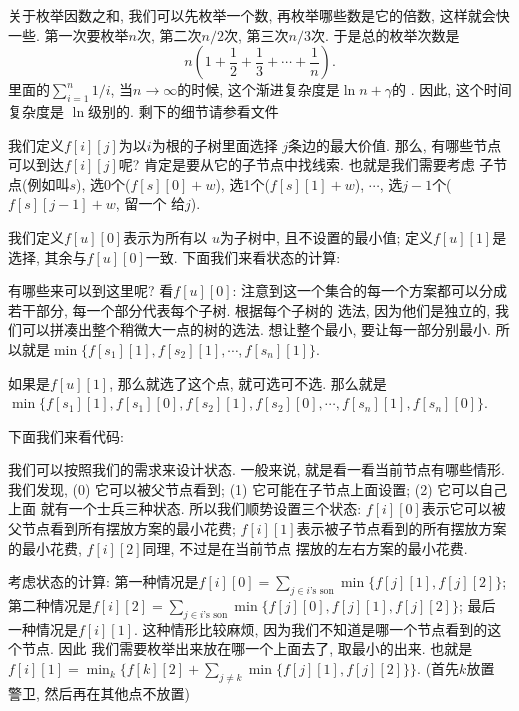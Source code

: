 关于枚举因数之和, 我们可以先枚举一个数, 再枚举哪些数是它的倍数, 这样就会快一些. 
第一次要枚举$n$次, 第二次$n/2$次, 第三次$n/3$次. 于是总的枚举次数是
$$
n\left(1+\frac12 +\frac13+\cdots + \frac1n\right).
$$
里面的$\sum_{i=1}^{n} 1/i$, 当$n\to \infty$的时候, 这个渐进复杂度是$\ln n + \gamma$的
. 
因此, 这个时间复杂度是
$\ln$级别的. 剩下的细节请参看文件

 我们定义$f[i][j]$为以$i$为根的子树里面选择
$j$条边的最大价值. 那么, 有哪些节点可以到达$f[i][j]$呢? 肯定是要从它的子节点中找线索. 也就是我们需要考虑
子节点(例如叫$s$), 选0个($f[s][0]+w$), 选1个($f[s][1]+w$), $\cdots$, 选$j-1$个($f[s][j-1]+w$, 留一个
给$j$). 

我们定义$f[u][0]$表示为所有以
$u$为子树中, 且不设置的最小值; 定义$f[u][1]$是选择, 其余与$f[u][0]$一致. 下面我们来看状态的计算: 

有哪些来可以到这里呢? 
看$f[u][0]$: 注意到这一个集合的每一个方案都可以分成若干部分, 每一个部分代表每个子树. 根据每个子树的
选法, 因为他们是独立的, 我们可以拼凑出整个稍微大一点的树的选法. 想让整个最小, 要让每一部分别最小. 
所以就是$\min\{f[s_1][1],f[s_2][1],\cdots, f[s_n][1]\}$. 

如果是$f[u][1]$, 那么就选了这个点, 就可选可不选. 
那么就是$\min\{f[s_1][1],f[s_1][0],f[s_2][1],f[s_2][0],\cdots, f[s_n][1],f[s_n][0]\}$.

下面我们来看代码: 

 我们可以按照我们的需求来设计状态. 
一般来说, 就是看一看当前节点有哪些情形. 我们发现, (0) 它可以被父节点看到; (1) 它可能在子节点上面设置; (2) 它可以自己上面
就有一个士兵三种状态. 所以我们顺势设置三个状态: $f[i][0]$表示它可以被父节点看到所有摆放方案的最小花费; 
$f[i][1]$表示被子节点看到的所有摆放方案的最小花费, $f[i][2]$同理, 不过是在当前节点
摆放的左右方案的最小花费. 

考虑状态的计算: 第一种情况是$f[i][0]=\sum_{j\in i\text{'s son}}\min\{f[j][1], f[j][2]\}$; 
第二种情况是$f[i][2]=\sum_{j\in i\text{'s son}}\min\{f[j][0], f[j][1], f[j][2]\}$; 最后
一种情况是$f[i][1]$. 这种情形比较麻烦, 因为我们不知道是哪一个节点看到的这个节点. 因此
我们需要枚举出来放在哪一个上面去了, 取最小的出来. 也就是
$f[i][1]=\min_k \{f[k][2]+\sum_{j\neq k}\min \{f[j][1], f[j][2]\}\}$. (首先$k$放置
警卫, 然后再在其他点不放置)

